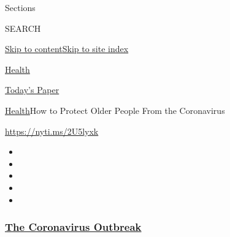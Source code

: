 Sections

SEARCH

\protect\hyperlink{site-content}{Skip to
content}\protect\hyperlink{site-index}{Skip to site index}

\href{https://www.nytimes3xbfgragh.onion/section/health}{Health}

\href{https://myaccount.nytimes3xbfgragh.onion/auth/login?response_type=cookie\&client_id=vi}{}

\href{https://www.nytimes3xbfgragh.onion/section/todayspaper}{Today's
Paper}

\href{/section/health}{Health}\textbar{}How to Protect Older People From
the Coronavirus

\url{https://nyti.ms/2U5lyxk}

\begin{itemize}
\item
\item
\item
\item
\item
\end{itemize}

\hypertarget{the-coronavirus-outbreak}{%
\subsubsection{\texorpdfstring{\href{https://www.nytimes3xbfgragh.onion/news-event/coronavirus?name=styln-coronavirus-national\&region=TOP_BANNER\&variant=undefined\&block=storyline_menu_recirc\&action=click\&pgtype=Article\&impression_id=2c183b40-e3b6-11ea-befc-036b724b9a9b}{The
Coronavirus
Outbreak}}{The Coronavirus Outbreak}}\label{the-coronavirus-outbreak}}

